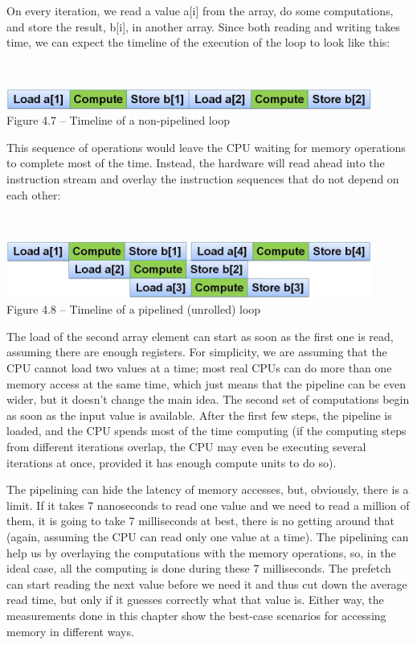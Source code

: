 On every iteration, we read a value a[i] from the array, do some computations, and store the result, b[i], in another array. Since both reading and writing takes time, we can expect the timeline of the execution of the loop to look like this:

\hspace*{\fill} \\ %
\begin{center}
\includegraphics[width=0.9\textwidth]{content/1/chapter4/images/7.jpg}\\
Figure 4.7 – Timeline of a non-pipelined loop
\end{center}

This sequence of operations would leave the CPU waiting for memory operations to complete most of the time. Instead, the hardware will read ahead into the instruction stream and overlay the instruction sequences that do not depend on each other:

\hspace*{\fill} \\ %
\begin{center}
\includegraphics[width=0.9\textwidth]{content/1/chapter4/images/8.jpg}\\
Figure 4.8 – Timeline of a pipelined (unrolled) loop
\end{center}

The load of the second array element can start as soon as the first one is read, assuming there are enough registers. For simplicity, we are assuming that the CPU cannot load two values at a time; most real CPUs can do more than one memory access at the same time, which just means that the pipeline can be even wider, but it doesn't change the main idea. The second set of computations begin as soon as the input value is available. After the first few steps, the pipeline is loaded, and the CPU spends most of the time computing (if the computing steps from different iterations overlap, the CPU may even be executing several iterations at once, provided it has enough compute units to do so).

The pipelining can hide the latency of memory accesses, but, obviously, there is a limit. If it takes 7 nanoseconds to read one value and we need to read a million of them, it is going to take 7 milliseconds at best, there is no getting around that (again, assuming the CPU can read only one value at a time). The pipelining can help us by overlaying the computations with the memory operations, so, in the ideal case, all the computing is done during these 7 milliseconds. The prefetch can start reading the next value before we need it and thus cut down the average read time, but only if it guesses correctly what that value is. Either way, the measurements done in this chapter show the best-case scenarios for accessing memory in different ways.

